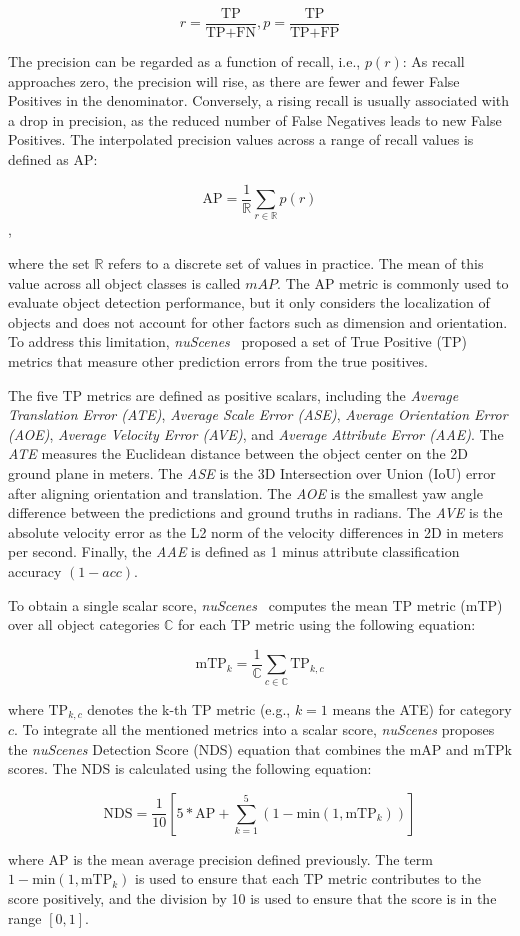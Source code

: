 \[
    r = \frac{\text{TP}}{\text{TP}+\text{FN}}, p = \frac{\text{TP}}{\text{TP}+\text{FP}}
\]

The precision can be regarded as a function of recall, i.e., $p(r)$: As recall approaches zero, the precision will rise, as there are fewer and fewer False Positives in the denominator.
Conversely, a rising recall is usually associated with a drop in precision, as the reduced number of False Negatives leads to new False Positives.
The interpolated precision values across a range of recall values is defined as AP:

\[
    \text{AP} = \frac{1}{\mathbb{R}} \sum_{r \in \mathbb{R}} p(r)
\],

where the set $\mathbb{R}$ refers to a discrete set of values in practice.
The mean of this value across all object classes is called $mAP$.
The AP metric is commonly used to evaluate object detection performance, but it only considers the localization of objects and does not account for other factors such as dimension and orientation.
To address this limitation, \textit{nuScenes}~\cite{caesar2020nuscenes} proposed a set of True Positive (TP) metrics that measure other prediction errors from the true positives.

The five TP metrics are defined as positive scalars, including the \textit{Average Translation Error (ATE)}, \textit{Average Scale Error (ASE)}, \textit{Average Orientation Error (AOE)}, \textit{Average Velocity Error (AVE)}, and \textit{Average Attribute Error (AAE)}.
The \textit{ATE} measures the Euclidean distance between the object center on the 2D ground plane in meters.
The \textit{ASE} is the 3D Intersection over Union (IoU) error after aligning orientation and translation.
The \textit{AOE} is the smallest yaw angle difference between the predictions and ground truths in radians.
The \textit{AVE} is the absolute velocity error as the L2 norm of the velocity differences in 2D in meters per second.
Finally, the \textit{AAE} is defined as 1 minus attribute classification accuracy $(1-acc)$.

To obtain a single scalar score, \textit{nuScenes}~\cite{caesar2020nuscenes} computes the mean TP metric (mTP) over all object categories $\mathbb{C}$ for each TP metric using the following equation:

\[
    \text{mTP}_k = \frac{1}{\mathbb{C}} \sum_{c \in \mathbb{C}} \text{TP}_{k,c}
\]

where $\text{TP}_{k,c}$ denotes the k-th TP metric (e.g., $k=1$ means the ATE) for category $c$.
To integrate all the mentioned metrics into a scalar score, \textit{nuScenes} proposes the \textit{nuScenes} Detection Score (NDS) equation that combines the mAP and mTPk scores.
The NDS is calculated using the following equation:

\[
    \text{NDS} = \frac{1}{10} \left[5 * \text{AP} + \sum^5_{k=1}(1-\text{min}(1, \text{mTP}_k))\right]
\]

where AP is the mean average precision defined previously.
The term $1-\text{min}(1, \text{mTP}_k)$ is used to ensure that each TP metric contributes to the score positively, and the division by 10 is used to ensure that the score is in the range $[0, 1]$.

